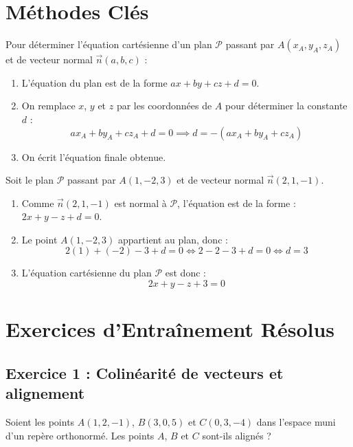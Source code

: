 \section{Méthodes Clés}

\begin{methode}
Pour déterminer l'équation cartésienne d'un plan $\mathcal{P}$ passant par $A(x_A, y_A, z_A)$ et de vecteur normal $\vec{n}(a, b, c)$ :
\begin{enumerate}
    \item L'équation du plan est de la forme $ax + by + cz + d = 0$.
    \item On remplace $x$, $y$ et $z$ par les coordonnées de $A$ pour déterminer la constante $d$ :
    \[
    a x_A + b y_A + c z_A + d = 0 \implies d = -(a x_A + b y_A + c z_A)
    \]
    \item On écrit l'équation finale obtenue.
\end{enumerate}
\end{methode}

\begin{exemple}
Soit le plan $\mathcal{P}$ passant par $A(1, -2, 3)$ et de vecteur normal $\vec{n}(2, 1, -1)$.
\begin{enumerate}
    \item Comme $\vec{n}(2, 1, -1)$ est normal à $\mathcal{P}$, l'équation est de la forme : $2x + y - z + d = 0$.
    \item Le point $A(1, -2, 3)$ appartient au plan, donc :
    \[
    2(1) + (-2) - 3 + d = 0 \iff 2 - 2 - 3 + d = 0 \iff d = 3
    \]
    \item L'équation cartésienne du plan $\mathcal{P}$ est donc :
    \[
    2x + y - z + 3 = 0
    \]
\end{enumerate}
\end{exemple}

\section{Exercices d'Entraînement Résolus}

\subsection*{Exercice 1 : Colinéarité de vecteurs et alignement}
Soient les points $A(1, 2, -1)$, $B(3, 0, 5)$ et $C(0, 3, -4)$ dans l'espace muni d'un repère orthonormé. Les points $A$, $B$ et $C$ sont-ils alignés ?


